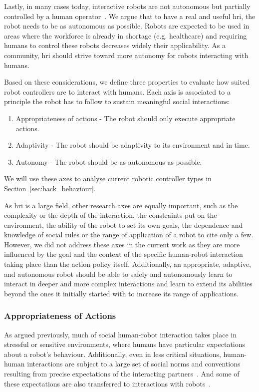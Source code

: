     Lastly, in many cases today, interactive robots are not autonomous but partially controlled by a human operator~\citep{riek2012wizard}. We argue that to have a real and useful \gls{hri}, the robot needs to be as autonomous as possible. %
    Robots are expected to be used in areas where the workforce is already in shortage (e.g. healthcare) and requiring humans to control these robots decreases widely their applicability. As a community, \gls{hri} should strive toward more autonomy for robots interacting with humans.
    
    Based on these considerations, we define three properties to evaluate how suited robot controllers are to interact with humans. Each axis is associated to a principle the robot has to follow to sustain meaningful social interactions:
    \begin{enumerate}
    	\item Appropriateness of actions - The robot should only execute appropriate actions.
    	\item Adaptivity - The robot should be adaptivity to its environment and in time.
    	\item Autonomy - The robot should be as autonomous as possible.
    \end{enumerate}
    We will use these axes to analyse current robotic controller types in Section~\ref{sec:back_behaviour}.    
    
    As \gls{hri} is a large field, other research axes are equally important, such as the complexity or the depth of the interaction, the constraints put on the environment, the ability of the robot to set its own goals, the dependence and knowledge of social rules or the range of application of a robot to cite only a few. However, we did not address these axes in the current work as they are more influenced by the goal and the context of the specific human-robot interaction taking place than the action policy itself. Additionally, an appropriate, adaptive, and autonomous robot should be able to safely and autonomously learn to interact in deeper and more complex interactions and learn to extend its abilities beyond the ones it initially started with to increase its range of applications.

\subsubsection{Appropriateness of Actions} \label{ssec:appropriateness} %
    As argued previously, much of social human-robot interaction takes place in  stressful or sensitive environments, where humans have particular expectations about a robot's behaviour. Additionally, even in less critical situations, human-human interactions are subject to a large set of social norms and conventions resulting from precise expectations of the interacting partners~\citep{sherif1936psychology}. And some of these expectations are also transferred to interactions with robots~\citep{bartneck2004design}.
    
